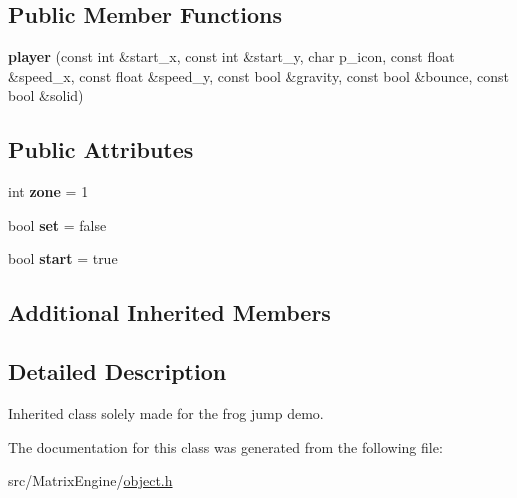 \subsection*{Public Member Functions}
\begin{DoxyCompactItemize}
\item 
\mbox{\label{classplayer_a72995ebeb95f9faba238be0217b3eb89}} 
{\bfseries player} (const int \&start\+\_\+x, const int \&start\+\_\+y, char p\+\_\+icon, const float \&speed\+\_\+x, const float \&speed\+\_\+y, const bool \&gravity, const bool \&bounce, const bool \&solid)
\end{DoxyCompactItemize}
\subsection*{Public Attributes}
\begin{DoxyCompactItemize}
\item 
\mbox{\label{classplayer_a94bd9c45e32717c2be52f46f4db6755f}} 
int {\bfseries zone} = 1
\item 
\mbox{\label{classplayer_acd04dcecfa678a879e13a26aefa137a2}} 
bool {\bfseries set} = false
\item 
\mbox{\label{classplayer_a003957a9fe0e6bef5e23316a44fba858}} 
bool {\bfseries start} = true
\end{DoxyCompactItemize}
\subsection*{Additional Inherited Members}


\subsection{Detailed Description}
Inherited class solely made for the frog jump demo. 

The documentation for this class was generated from the following file\+:\begin{DoxyCompactItemize}
\item 
src/\+Matrix\+Engine/\hyperlink{object_8h}{object.\+h}\end{DoxyCompactItemize}
